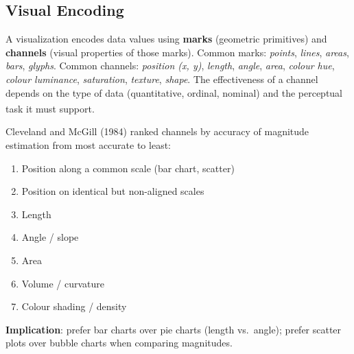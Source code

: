 \subsection{Visual Encoding}

\begin{tcbitemize}[ skin=sectionraster ]
    \tcbitem[title={Marks and Channels}, raster multicolumn=3]
    A visualization encodes data values using \textbf{marks} (geometric primitives) and
    \textbf{channels} (visual properties of those marks).
    Common marks: \emph{points}, \emph{lines}, \emph{areas}, \emph{bars}, \emph{glyphs}.
    Common channels: \emph{position (x, y)}, \emph{length}, \emph{angle}, \emph{area},
    \emph{colour hue}, \emph{colour luminance}, \emph{saturation}, \emph{texture},
    \emph{shape}.
    The effectiveness of a channel depends on the type of data (quantitative, ordinal,
    nominal) and the perceptual task it must
    support\textsuperscript{\cite[][pp.~30--50]{jansenHandbuchInfografik1999}}.

    \tcbitem[title={Cleveland \& McGill Effectiveness Ranking}, raster multicolumn=3]
    Cleveland and McGill (1984) ranked channels by accuracy of magnitude estimation from
    most accurate to least:
    \begin{enumerate}
        \item Position along a common scale (bar chart, scatter)
        \item Position on identical but non-aligned scales
        \item Length
        \item Angle / slope
        \item Area
        \item Volume / curvature
        \item Colour shading / density
    \end{enumerate}
    \textbf{Implication}: prefer bar charts over pie charts (length vs.\ angle); prefer
    scatter plots over bubble charts when comparing magnitudes.


\end{tcbitemize}
